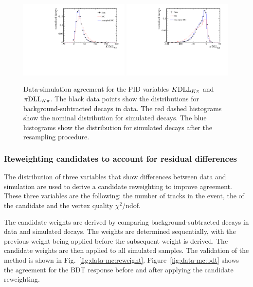 \begin{figure}[!tb]
 \centering
 \includegraphics[width=0.49\textwidth]{figs/kpimm/data-mc/resampling/K_PIDK.pdf}
 \includegraphics[width=0.49\textwidth]{figs/kpimm/data-mc/resampling/Pi_PIDK.pdf}
 \caption{Data-simulation agreement for the PID variables ${K}\mathrm{DLL}_{{K}{\pi}}$ and ${\pi}\mathrm{DLL}_{{K}{\pi}}$. The black data points show the distributions for background-subtracted \BdToJPsiKst decays in data. The red dashed histograms show the nominal distribution for simulated \BdToJPsiKst decays. The blue histograms show the distribution for simulated \BdToJPsiKst decays after the resampling procedure.}
\label{fig:kpimm:data-mc:pid}
\end{figure}

\subsubsection{Reweighting candidates to account for residual differences}
\label{sec:kpimm:data-mc:reweight}

The distribution of three variables that show differences between data and simulation are used to derive a candidate reweighting to improve agreement. These three variables are the following: the number of tracks in the event, the \pt of the \Bz candidate and the \Bz vertex quality $\chi^{2}$/ndof.
 
The candidate weights are derived by comparing background-subtracted \BdToJPsiKst decays in data and simulated \BdToJPsiKst decays. 
The weights are determined sequentially, with the previous weight being applied before the subsequent weight is derived. The candidate weights are then applied to all simulated samples. The validation of the method is shown in Fig.~\ref{fig:data-mc:reweight}. Figure~\ref{fig:data-mc:bdt} shows the agreement for the BDT response before and after applying the candidate reweighting.

